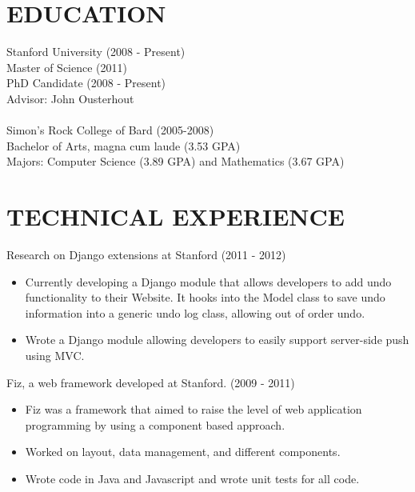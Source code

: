 \documentclass{res}
\begin{document}
 


\address{\bf 144 Ayrshire Farm Ln Apt \#103\\Stanford, CA 94305\\estrat@cs.stanford.edu\\(203) 645-9982\\\url{http://github.com/ericstratmann}}
\address{}
                                  
\begin{resume}
  
\section{EDUCATION}          
Stanford University (2008 - Present) \\
Master of Science (2011) \\
PhD Candidate (2008 - Present)\\
Advisor: John Ousterhout \\
\\
Simon's Rock College of Bard (2005-2008)\\
Bachelor of Arts, magna cum laude (3.53 GPA)\\
Majors: Computer Science (3.89 GPA) and Mathematics (3.67 GPA)

\section{TECHNICAL EXPERIENCE}

Research on Django extensions at Stanford (2011 - 2012)
\begin{itemize}
    \item { Currently developing a Django module that allows developers to add undo functionality to their Website. It hooks into the Model class to save undo information into a generic undo log class, allowing out of order undo. }
    \item { Wrote a Django module allowing developers to easily support server-side push using MVC.}
\end{itemize}

Fiz, a web framework developed at Stanford. (2009 - 2011)
\begin{itemize}
    \item Fiz was a framework that aimed to raise  the level of web application programming by using a component based approach.
    \item Worked on layout, data management, and different components.
    \item Wrote code in Java and Javascript and wrote unit tests for all code.
\end{itemize}


\end{resume}
\end{document}
